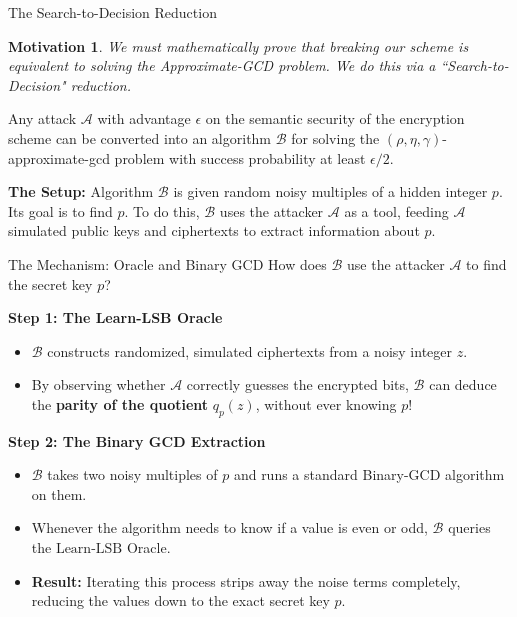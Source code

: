 \documentclass[10pt]{beamer}
\newtheorem{motivation}{Motivation}
\begin{document}
\begin{frame}{The Search-to-Decision Reduction}
    \begin{motivation}
    We must mathematically prove that breaking our scheme is equivalent to solving the Approximate-GCD problem. We do this via a ``Search-to-Decision" reduction.
    \end{motivation}
    \pause
    
    \vspace{0.3cm}
    \begin{theorem}
    Any attack $\mathcal{A}$ with advantage $\epsilon$ on the semantic security of the encryption scheme can be converted into an algorithm $\mathcal{B}$ for solving the $(\rho, \eta, \gamma)$-approximate-gcd problem with success probability at least $\epsilon/2$.
    \end{theorem}
    \pause
    
    \vspace{0.3cm}
    \textbf{The Setup:} 
    Algorithm $\mathcal{B}$ is given random noisy multiples of a hidden integer $p$. Its goal is to find $p$. To do this, $\mathcal{B}$ uses the attacker $\mathcal{A}$ as a tool, feeding $\mathcal{A}$ simulated public keys and ciphertexts to extract information about $p$.
\end{frame}

\begin{frame}{The Mechanism: Oracle and Binary GCD}
    How does $\mathcal{B}$ use the attacker $\mathcal{A}$ to find the secret key $p$?
    \pause

    \vspace{0.3cm}
    \textbf{Step 1: The Learn-LSB Oracle}
    \begin{itemize}
        \item $\mathcal{B}$ constructs randomized, simulated ciphertexts from a noisy integer $z$.
        \item By observing whether $\mathcal{A}$ correctly guesses the encrypted bits, $\mathcal{B}$ can deduce the \textbf{parity of the quotient} $q_p(z)$, without ever knowing $p$!
    \end{itemize}
    \pause

    \vspace{0.3cm}
    \textbf{Step 2: The Binary GCD Extraction}
    \begin{itemize}
        \item $\mathcal{B}$ takes two noisy multiples of $p$ and runs a standard Binary-GCD algorithm on them.
        \item Whenever the algorithm needs to know if a value is even or odd, $\mathcal{B}$ queries the $\text{Learn-LSB}$ Oracle.
        \item \textbf{Result:} Iterating this process strips away the noise terms completely, reducing the values down to the exact secret key $p$.
    \end{itemize}
\end{frame}
\end{document}
